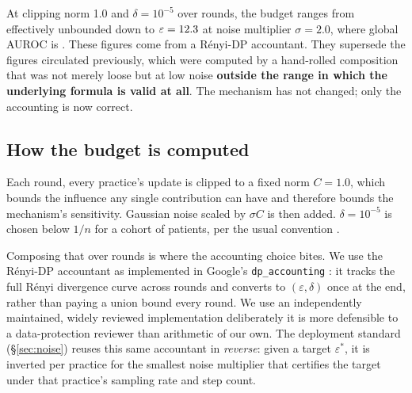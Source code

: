 \label{sec:budget}
\statusMeasured

\begin{shortanswer}
At clipping norm 1.0 and $\delta = 10^{-5}$ over \DPRounds{} rounds, the budget ranges from
effectively unbounded down to $\varepsilon = 12.3{}$ at noise multiplier $\sigma = 2.0$,
where global AUROC is \AUCAtSigmaTwo{}. These figures come from a R\'enyi-DP accountant. They
supersede the figures circulated previously, which were computed by a hand-rolled composition that
was not merely loose but at low noise \textbf{outside the range in which the underlying
formula is valid at all}. The mechanism has not changed; only the accounting is now correct.
\end{shortanswer}

\subsection{How the budget is computed}

Each round, every practice's update is clipped to a fixed norm $C = 1.0$, which bounds the influence
any single contribution can have and therefore bounds the mechanism's sensitivity. Gaussian noise
scaled by $\sigma C$ is then added. $\delta = 10^{-5}$ is chosen below $1/n$ for a cohort of
\NumPatients{} patients, per the usual convention \cite{dwork2014dp}.

Composing that over \DPRounds{} rounds is where the accounting choice bites. We use the R\'enyi-DP
accountant \cite{mironov2017rdp} as implemented in Google's \texttt{dp\_accounting} \cite{dpaccounting}: it tracks the full R\'enyi divergence curve across
rounds and converts to $(\varepsilon, \delta)$ once at the end, rather than paying a union bound
every round. We use an independently maintained, widely reviewed implementation deliberately
it is more defensible to a data-protection reviewer than arithmetic of our own. The deployment
standard (\S\ref{sec:noise}) reuses this same accountant in \emph{reverse}: given a target
$\varepsilon^{*}$, it is inverted per practice for the smallest noise multiplier that certifies
the target under that practice's sampling rate and step count.

\begin{table}[htbp]
  \centering
  \caption{Central DP: Flower's server-side fixed-clipping wrapper over federated averaging,
  clipping norm 1.0, \NumPractices{} non-IID practices, \DPRounds{} rounds, \NumSeeds{} seeds.
  The naive-bound column is the superseded accounting, shown for comparison only.}
  
  \label{tab:dpcentral}
\end{table}

